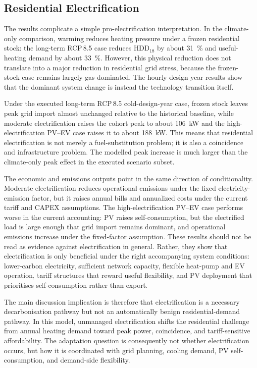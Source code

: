 \subsection{Residential Electrification}
The results complicate a simple pro-electrification interpretation. In the climate-only comparison, warming reduces heating pressure under a frozen residential stock: the long-term RCP\,8.5 case reduces HDD$_{18}$ by about \SI{31}{\percent} and useful-heating demand by about \SI{33}{\percent}. However, this physical reduction does not translate into a major reduction in residential grid stress, because the frozen-stock case remains largely gas-dominated. The hourly design-year results show that the dominant system change is instead the technology transition itself.

Under the executed long-term RCP\,8.5 cold-design-year case, frozen stock leaves peak grid import almost unchanged relative to the historical baseline, while moderate electrification raises the cohort peak to about \SI{106}{kW} and the high-electrification PV--EV case raises it to about \SI{188}{kW}. This means that residential electrification is not merely a fuel-substitution problem; it is also a coincidence and infrastructure problem. The modelled peak increase is much larger than the climate-only peak effect in the executed scenario subset.

The economic and emissions outputs point in the same direction of conditionality. Moderate electrification reduces operational emissions under the fixed electricity-emission factor, but it raises annual bills and annualized costs under the current tariff and CAPEX assumptions. The high-electrification PV--EV case performs worse in the current accounting: PV raises self-consumption, but the electrified load is large enough that grid import remains dominant, and operational emissions increase under the fixed-factor assumption. These results should not be read as evidence against electrification in general. Rather, they show that electrification is only beneficial under the right accompanying system conditions: lower-carbon electricity, sufficient network capacity, flexible heat-pump and EV operation, tariff structures that reward useful flexibility, and PV deployment that prioritises self-consumption rather than export.

The main discussion implication is therefore that electrification is a necessary decarbonisation pathway but not an automatically benign residential-demand pathway. In this model, unmanaged electrification shifts the residential challenge from annual heating demand toward peak power, coincidence, and tariff-sensitive affordability. The adaptation question is consequently not whether electrification occurs, but how it is coordinated with grid planning, cooling demand, PV self-consumption, and demand-side flexibility.



